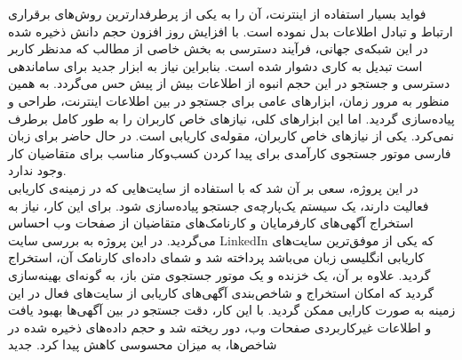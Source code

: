 

\pagestyle{empty}

\begin{center}
\end{center}
فواید بسیار استفاده از اینترنت، آن را به یکی از پرطرفدارترین روش‌های برقراری ارتباط و تبادل اطلاعات بدل نموده است. با افزایش روز افزون حجم دانش ذخیره شده در این شبکه‌ی جهانی، فرآیند دسترسی به بخش خاصی از مطالب که مدنظر کاربر است تبدیل به کاری دشوار شده است. بنابراین نیاز به ابزار جدید برای ساماندهی دسترسی و جستجو در این حجم انبوه از اطلاعات بیش از پیش حس می‌گردد. به همین منظور به مرور زمان، ابزارهای عامی برای جستجو در بین اطلاعات اینترنت، طراحی و پیاده‌سازی گردید. اما این ابزارهای کلی، نیازهای خاص کاربران را به طور کامل برطرف نمی‌کرد. یکی از نیازهای خاص کاربران، مقوله‌ی کاریابی است. در حال حاضر برای زبان فارسی موتور جستجوی کارآمدی برای پیدا کردن کسب‌وکار مناسب برای متقاضیان کار وجود ندارد.
\\
در این پروژه، سعی بر آن شد که با استفاده از سایت‌هایی که در زمینه‌ی کاریابی فعالیت دارند، یک سیستم یک‌پارچه‌ی جستجو پیاده‌سازی شود. برای این کار، نیاز به استخراج آگهی‌های کارفرمایان و کارنامک‌های متقاضیان از صفحات وب احساس می‌گردید. در این پروژه به بررسی سایت LinkedIn که یکی از موفق‌ترین سایت‌های کاریابی انگلیسی زبان می‌باشد پرداخته شد و شمای داده‌ای کارنامک آن، استخراج گردید. علاوه بر آن، یک خزنده و یک موتور جستجوی متن باز، به گونه‌ای بهینه‌سازی گرديد که امکان استخراج و شاخص‌بندی آگهی‌های کاریابی از سایت‌های فعال در این زمینه به صورت کارایی ممکن گردید. با این کار، دقت جستجو در بین آگهی‌ها بهبود یافت و اطلاعات غیرکاربردی صفحات وب، دور ریخته شد و حجم داده‌های ذخیره شده در شاخص‌ها، به میزان محسوسی کاهش پیدا کرد.
‌جدید
